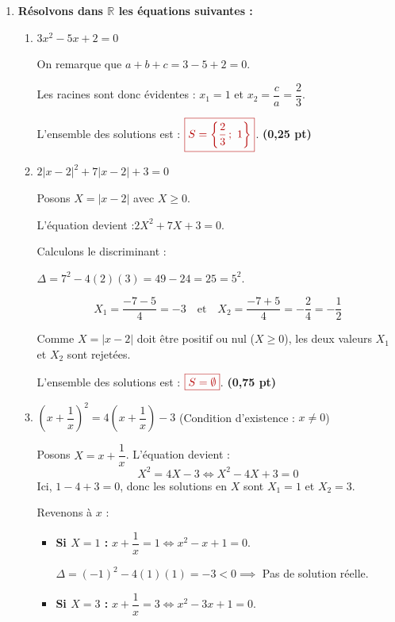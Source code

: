 \documentclass[12pt,a4paper]{article}
\newcommand{\redtitle}[1]{\textcolor{myred}{\textbf{#1}}}
\newcommand{\redbox}[1]{\color{myred}\boxed{#1}\color{black}}
\begin{document}
\begin{enumerate}
    \item \redtitle{Résolvons dans $\mathbb{R}$ les équations suivantes :}
    
    \begin{enumerate}
        \item $3x^2 - 5x + 2 = 0$
        
        On remarque que $a + b + c = 3 - 5 + 2 = 0$. 
        
        Les racines sont donc évidentes : $x_1 = 1$ et $x_2 = \dfrac{c}{a} = \dfrac{2}{3}$.
        
        L'ensemble des solutions est : $\redbox{S = \left\{\dfrac{2}{3} \,;~ 1\right\}}$. \hfill \textbf{(0,25 pt)}
        
        \item $2|x - 2|^2 + 7|x - 2| + 3 = 0$
        
        Posons $X = |x - 2|$ avec $X \geq 0$.
        
        L'équation devient :$2X^2 + 7X + 3 = 0$.
        
        Calculons le discriminant :
        
         $\Delta = 7^2 - 4(2)(3) = 49 - 24 = 25 = 5^2$.
        
        \[ X_1 = \dfrac{-7 - 5}{4} = -3 \quad \text{et} \quad X_2 = \dfrac{-7 + 5}{4} = -\dfrac{2}{4} = -\dfrac{1}{2} \]
        
        Comme $X = |x - 2|$ doit être positif ou nul ($X \geq 0$), les deux valeurs $X_1$ et $X_2$ sont rejetées.
        
        L'ensemble des solutions est : $\redbox{S = \emptyset}$. \hfill \textbf{(0,75 pt)}
        
        \item $\left(x + \dfrac{1}{x}\right)^2 = 4\left(x + \dfrac{1}{x}\right) - 3$ \quad (Condition d'existence : $x \neq 0$)
        
        Posons $X = x + \dfrac{1}{x}$. L'équation devient :
        \[ X^2 = 4X - 3 \iff X^2 - 4X + 3 = 0 \]
        Ici, $1 - 4 + 3 = 0$, donc les solutions en $X$ sont $X_1 = 1$ et $X_2 = 3$.
        
        Revenons à $x$ :
        \begin{itemize}
            \item \textbf{Si $X = 1$ :} $x + \dfrac{1}{x} = 1 \iff x^2 - x + 1 = 0$. 
            
            $\Delta = (-1)^2 - 4(1)(1) = -3 < 0 \implies$ Pas de solution réelle.
            \item \textbf{Si $X = 3$ :} $x + \dfrac{1}{x} = 3 \iff x^2 - 3x + 1 = 0$.
            

\end{itemize}
\end{enumerate}
\end{enumerate}
\end{document}
